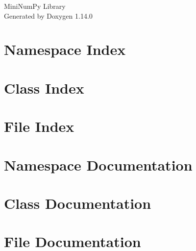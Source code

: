\documentclass[twoside]{book}
\newcommand{\+}{\discretionary{\mbox{\scriptsize$\hookleftarrow$}}{}{}}
\newcommand{\clearemptydoublepage}{%
    \newpage{\pagestyle{empty}\cleardoublepage}%
  }
\begin{document}
  \raggedbottom
    \hypersetup{pageanchor=false,
                bookmarksnumbered=true,
                pdfencoding=unicode
               }
  \begin{titlepage}
  \vspace*{7cm}
  \begin{center}%
  {\Large Mini\+Num\+Py Library}\\
  \vspace*{1cm}
  {\large Generated by Doxygen 1.14.0}\\
  \end{center}
  \end{titlepage}
  \clearemptydoublepage
  \tableofcontents
  \clearemptydoublepage
  \hypersetup{pageanchor=true}
\chapter{Namespace Index}

\chapter{Class Index}

\chapter{File Index}

\chapter{Namespace Documentation}



\chapter{Class Documentation}

\chapter{File Documentation}



  \backmatter
  \newpage
  \clearemptydoublepage
  \printindex
\end{document}
